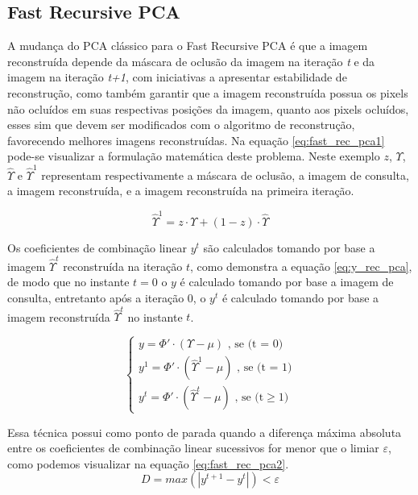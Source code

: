 \subsection{Fast Recursive PCA}
A mudança do PCA clássico para o Fast Recursive PCA \cite{wang2007reconstruction} é que a imagem reconstruída depende da máscara de oclusão da imagem na iteração \textit{t} e da imagem na iteração \textit{t+1}, com iniciativas a apresentar estabilidade de reconstrução, como também garantir que a imagem reconstruída possua os pixels não ocluídos em suas respectivas posições da imagem, quanto aos pixels ocluídos, esses sim que devem ser modificados com o algoritmo de reconstrução, favorecendo melhores imagens reconstruídas. Na equação \ref{eq:fast_rec_pca1} pode-se visualizar a formulação matemática deste problema. Neste exemplo $z$, $\Upsilon$, $\hat{\Upsilon}$ e $\hat{\Upsilon}^1$ representam respectivamente a máscara de oclusão, a imagem de consulta, a imagem reconstruída, e a imagem reconstruída na primeira iteração. 

\begin{equation}
\label{eq:fast_rec_pca1}
\hat{\Upsilon}^1  =  z \cdot \Upsilon + (1- z)\cdot \hat{\Upsilon} 
\end{equation}

Os coeficientes de combinação linear $y^t$ são calculados tomando por base a imagem $\hat{\Upsilon}^t$ reconstruída na iteração $t$, como demonstra a equação \ref{eq:y_rec_pca}, de modo que no instante $t=0$ o $y$ é calculado tomando por base a imagem de consulta, entretanto após a iteração $0$, o $y^t$ é calculado tomando por base a imagem reconstruída $\hat{\Upsilon}^t$ no instante $t$.

\begin{equation}
\label{eq:y_rec_pca}
\left\{\begin{matrix}
y  = \Phi' \cdot (\Upsilon - \mu)   \mbox{ , se (t = 0)}\\
y^1  = \Phi' \cdot (\hat{\Upsilon}^1 - \mu)   \mbox{ , se (t = 1)}\\ 
y^t  = \Phi' \cdot (\hat{\Upsilon}^t - \mu)    \mbox{ , se (t} \geq 1)
\end{matrix}\right.
\end{equation}


Essa técnica possui como ponto de parada quando a diferença máxima absoluta entre os coeficientes de combinação linear sucessivos for menor que o limiar $\varepsilon$, como podemos visualizar na equação \ref{eq:fast_rec_pca2}.
\begin{equation}
\label{eq:fast_rec_pca2}
D = max(\left | y^{t+1} - y^t\right |) < \varepsilon 
\end{equation}


